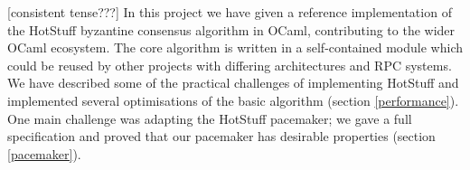 




[consistent tense???]
In this project we have given a reference implementation of the HotStuff byzantine consensus algorithm in OCaml, contributing to the wider OCaml ecosystem. The core algorithm is written in a self-contained module which could be reused by other projects with differing architectures and RPC systems. We have described some of the practical challenges of implementing HotStuff and implemented several optimisations of the basic algorithm (section \ref{performance}). One main challenge was adapting the HotStuff pacemaker; we gave a full specification and proved that our pacemaker has desirable properties (section \ref{pacemaker}).

